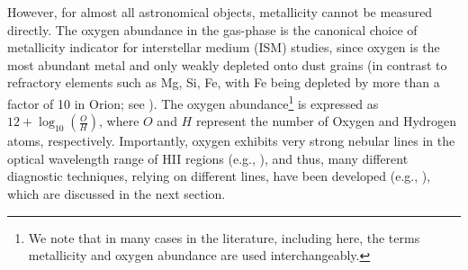 \documentclass{emulateapj}
\begin{document}

However, for almost all astronomical objects, metallicity cannot be measured directly. The oxygen abundance in the gas-phase is the canonical choice of metallicity indicator for interstellar medium (ISM) studies, since oxygen is the most abundant metal and only weakly depleted onto dust grains (in contrast to refractory elements such as Mg, Si, Fe, with Fe being depleted by more than a factor of 10 in Orion; see \citealt{simondiaz11-orion}). The oxygen abundance\footnote{We note that in many cases in the literature, including here, the terms metallicity and oxygen abundance are used interchangeably.} is expressed as  $12 + \log_{10}(\frac{O}{H})$, where $O$ and $H$ represent the number of Oxygen and Hydrogen atoms, respectively. Importantly, oxygen exhibits very strong nebular lines in the optical wavelength range of HII regions (e.g., \citealt{pagel79,osterbrock89,tremonti04}), and thus, many different diagnostic techniques, relying on different lines, have been developed (e.g., \citealt{kewley02,pettini04,kobulnicky04,kewley08}), which are discussed in the next section.
\end{document}
